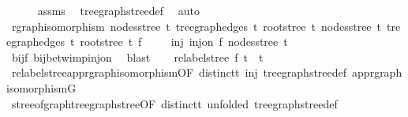 \begin{isabellebody}
\ \ \ \ \isamarkupfalse%
\ assms\ \isamarkupfalse%
\ tree{\isacharunderscore}{\kern0pt}graph{\isacharunderscore}{\kern0pt}stree{\isacharunderscore}{\kern0pt}def\ \isamarkupfalse%
\ auto\isanewline
\ \ \isamarkupfalse%
\ \isamarkupfalse%
\ rgraph{\isacharunderscore}{\kern0pt}isomorphism\ {\isachardoublequoteopen}nodes{\isacharunderscore}{\kern0pt}stree\ t{}{\isachardoublequoteclose}\ {\isachardoublequoteopen}tree{\isacharunderscore}{\kern0pt}graph{\isacharunderscore}{\kern0pt}edges\ t{}{\isachardoublequoteclose}\ {\isachardoublequoteopen}root{\isacharunderscore}{\kern0pt}stree\ t{}{\isachardoublequoteclose}\ {\isachardoublequoteopen}nodes{\isacharunderscore}{\kern0pt}stree\ t{}{\isachardoublequoteclose}\ {\isachardoublequoteopen}tree{\isacharunderscore}{\kern0pt}graph{\isacharunderscore}{\kern0pt}edges\ t{}{\isachardoublequoteclose}\ {\isachardoublequoteopen}root{\isacharunderscore}{\kern0pt}stree\ t{}{\isachardoublequoteclose}\ f\ \isacommand{{\isachardot}{\kern0pt}}\isamarkupfalse%
\isanewline
\ \ \isamarkupfalse%
\ inj{\isacharcolon}{\kern0pt}\ {\isachardoublequoteopen}inj{\isacharunderscore}{\kern0pt}on\ f\ {\isacharparenleft}{\kern0pt}nodes{\isacharunderscore}{\kern0pt}stree\ t{}{\isacharparenright}{\kern0pt}{\isachardoublequoteclose}\ \isamarkupfalse%
\ bij{\isacharunderscore}{\kern0pt}f\ bij{\isacharunderscore}{\kern0pt}betw{\isacharunderscore}{\kern0pt}imp{\isacharunderscore}{\kern0pt}inj{\isacharunderscore}{\kern0pt}on\ \isamarkupfalse%
\ blast\isanewline
\ \ \isamarkupfalse%
\ {\isachardoublequoteopen}relabel{\isacharunderscore}{\kern0pt}stree\ f\ t{}\ {\isacharequal}{\kern0pt}\ t{}{\isachardoublequoteclose}\isanewline
\ \ \ \ \isamarkupfalse%
\ relabel{\isacharunderscore}{\kern0pt}stree{\isacharunderscore}{\kern0pt}app{\isacharunderscore}{\kern0pt}rgraph{\isacharunderscore}{\kern0pt}isomorphism{\isacharbrackleft}{\kern0pt}OF\ distinct{\isacharunderscore}{\kern0pt}t{}\ inj{\isacharbrackright}{\kern0pt}\ tree{\isacharunderscore}{\kern0pt}graph{\isacharunderscore}{\kern0pt}stree{\isacharunderscore}{\kern0pt}def\ app{\isacharunderscore}{\kern0pt}rgraph{\isacharunderscore}{\kern0pt}isomorphism{\isacharunderscore}{\kern0pt}G\isanewline
\ \ \ \ \isamarkupfalse%
\ stree{\isacharunderscore}{\kern0pt}of{\isacharunderscore}{\kern0pt}graph{\isacharunderscore}{\kern0pt}tree{\isacharunderscore}{\kern0pt}graph{\isacharunderscore}{\kern0pt}stree{\isacharbrackleft}{\kern0pt}OF\ distinct{\isacharunderscore}{\kern0pt}t{}{\isacharcomma}{\kern0pt}\ unfolded\ tree{\isacharunderscore}{\kern0pt}graph{\isacharunderscore}{\kern0pt}stree{\isacharunderscore}{\kern0pt}def{\isacharbrackright}{\kern0pt}\ \isamarkupfalse%

\end{isabellebody}
